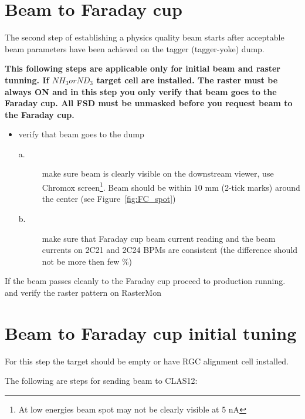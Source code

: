 \clearpage
\section{Beam to Faraday cup}
\indent

The second step of establishing a physics quality beam starts after acceptable beam parameters have been achieved on the tagger (tagger-yoke) dump. 

\vspace{5mm}
{\large\bf This following steps are applicable only for initial beam and raster tunning. If $NH_3 or ND_3$ target cell are installed. The raster must be always ON and in this step you only verify that beam goes to the Faraday cup. All FSD must be unmasked before you request beam to the Faraday cup.}
\begin{itemize}
\item verify that beam goes to the dump 
\begin{description}
\item[a.] make sure beam is clearly visible on the downstream viewer, use Chromox screen\footnote{At low energies beam spot may not be clearly visible at 5 nA}. Beam should be within $10$ mm (2-tick marks) around the center (see Figure~\ref{fig:FC_spot})
\item[b.] make sure that Faraday cup beam current reading and the beam currents on 2C21 and 2C24 BPMs are consistent (the difference  should not be more then few \%)
\end{description}
\end{itemize}

If the beam passes cleanly to the Faraday cup proceed to production running. 
and verify the raster pattern on RasterMon \cite{rastermon}
\vspace{5mm}

\section{Beam to Faraday cup initial tuning}

For this step the target should be empty or have RGC alignment cell installed.

The following are steps for sending beam to CLAS12:

